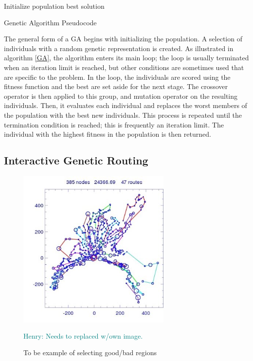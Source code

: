 \documentclass{sig-alternate}
\newcommand{\allcomments}[1]{{#1}}
\newcommand{\hfcomment}[1]{\textcolor{Teal}{\allcomments{Henry: {#1}}}}
\begin{document}
\begin{algorithm}[t]
Initialize population\;
\Return best solution\;
\caption{Genetic Algorithm Pseudocode\label{GA}}
\end{algorithm}

The general form of a GA begins with initializing the population. A selection of individuals with a random genetic representation is created. As illustrated in algorithm \ref{GA}, the algorithm enters its main loop; the loop is usually terminated when an iteration limit is reached, but other conditions are sometimes used that are specific to the problem. In the loop, the individuals are scored using the fitness function and the best are set aside for the next stage. The crossover operator is then applied to this group, and mutation operator on the resulting individuals. Then, it evaluates each individual and replaces the worst members of the population with the best new individuals. This process is repeated until the termination condition is reached; this is frequently an iteration limit. The individual with the highest fitness in the population is then returned.
\subsection{Interactive Genetic Routing}

\begin{figure}
\centering
\includegraphics[width=3in, keepaspectratio]{vrp2.jpg}
\caption{To be example of selecting good/bad regions}
\hfcomment{Needs to replaced w/own image.}
\label{fig:Humangraph}
\end{figure}
\end{document}
